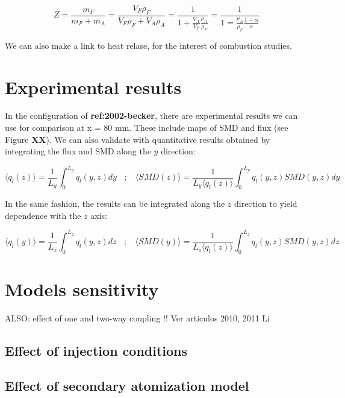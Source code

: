 \begin{equation}
Z = \frac{m_F}{m_F + m_A} = \frac{V_F \rho_F}{V_F \rho_F + V_A \rho_A} = \frac{1}{1 + \frac{V_A}{V_F} \frac{\rho_A}{\rho_F}} = \frac{1}{1 = \frac{\rho_A}{\rho_F} \frac{1 - \alpha}{\alpha}}
\end{equation}


We can also make a link to heat relase, for the interest of combustion studies.

\section{Experimental results}

In the configuration of \textbf{ref:2002-becker}, there are experimental results we can use for comparison at x = 80 mm. These include maps of SMD and flux (see Figure \textbf{XX}). We can also validate with quantitative results obtained by integrating the flux and SMD along the $y$ direction:

\begin{equation}
\langle q_l \left( z \right) \rangle = \frac{1}{L_y} \int_0^{L_y} q_l \left( y, z \right) dy ~~~~; ~~~~ \langle SMD \left( z \right) \rangle = \frac{1}{L_y \langle q_l \left( z \right) \rangle} \int_0^{L_y} q_l \left( y, z \right) SMD \left( y, z \right) dy
\end{equation}

In the same fashion, the results can be integrated along the $z$ direction to yield dependence with the $z$ axis:

\begin{equation}
\langle q_l \left( y \right) \rangle = \frac{1}{L_z} \int_0^{L_z} q_l \left( y, z \right) dz ~~~~; ~~~~ \langle SMD \left( y \right) \rangle = \frac{1}{L_z \langle q_l \left( z \right) \rangle} \int_0^{L_z} q_l \left( y, z \right) SMD \left( y, z \right) dz
\end{equation}


\section{Models sensitivity}

ALSO: effect of one and two-way coupling !! Ver articulos 2010, 2011 Li 

\subsection{Effect of injection conditions}

\subsection{Effect of secondary atomization model}

